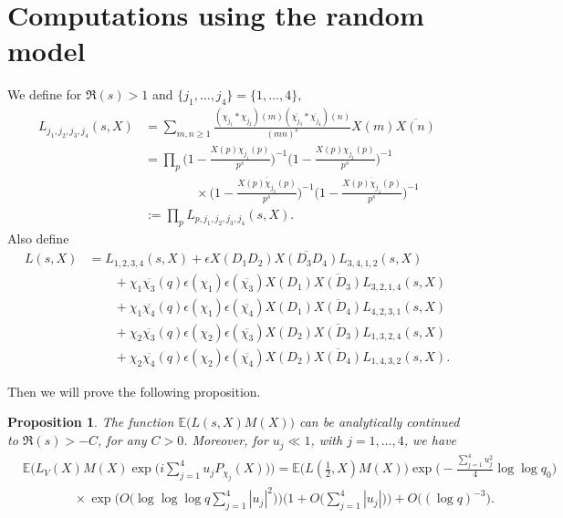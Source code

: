 \documentclass[12pt, reqno]{amsart}
\newcommand{\E}{\mathbb{E}}
\newtheorem{proposition}[theorem]{Proposition}
\numberwithin{equation}{section}
\numberwithin{theorem}{section}
\numberwithin{equation}{section}
\begin{document}
\section{Computations using the random model}\label{sectionrandom}
We define for $\Re(s)>1$ and $\{j_1,\ldots, j_4\}=\{1,\ldots,4\}$,
\begin{align*}
    L_{j_1,j_2,j_3,j_4}(s,X) &= \sum_{m,n \geq 1}\frac{(\chi_{j_1}*\chi_{j_2})(m)(\overline{\chi_{j_3}}*\overline{\chi_{j_4}})(n)}{(mn)^{s}}X(m) \overline{X(n)} \\
    & = \prod_p \Big( 1- \frac{X(p) \chi_{j_1}(p)}{p^s}\Big)^{-1} \Big( 1- \frac{X(p) \chi_{j_2}(p)}{p^s}\Big)^{-1} \\
    &\qquad\qquad\times\Big( 1- \frac{\overline{X(p) \chi_{j_3}(p)}}{p^s}\Big)^{-1}\Big( 1- \frac{\overline{X(p) \chi_{j_4}(p)}}{p^s}\Big)^{-1}\\
    &:= \prod_p L_{p,j_1,j_2,j_3,j_4}(s,X).
\end{align*}
Also define
\begin{align}
    L(s,X) &=  L_{1,2,3,4}(s,X)+\epsilon X(D_1D_2) \overline{X(D_3D_4)} L_{3,4,1,2}(s,X) \label{lx} \\
&\qquad+ \chi_1\overline{\chi_3}(q)\epsilon(\chi_1)\epsilon(\overline{\chi_3}) X(D_1) \overline{X(D_3)} L_{3,2,1,4}(s,X) \nonumber \\
&\qquad+\chi_1\overline{\chi_4}(q)\epsilon(\chi_1)\epsilon(\overline{\chi_4}) X(D_1) \overline{X(D_4)}L_{4,2,3,1}(s,X) \nonumber \\
&\qquad+\chi_2\overline{\chi_3}(q)\epsilon(\chi_2)\epsilon(\overline{\chi_3})X(D_2) \overline{X(D_3)} L_{1,3,2,4}(s,X) \nonumber \\
&\qquad+\chi_2\overline{\chi_4}(q)\epsilon(\chi_2)\epsilon(\overline{\chi_4})X(D_2) \overline{X(D_4)}L_{1,4,3,2}(s,X).\nonumber
\end{align}

Then we will prove the following proposition.

\begin{proposition}
\label{main_prop}
    The function $\E\big(L(s,X) M(X)\big)$ can be analytically continued to $\Re(s)>-C$, for any $C>0$. Moreover, for $u_j\ll1$, with $j=1,\ldots,4$, we have
    \begin{align*}
        &\E\Bigg( L_V(X) M(X) \exp\bigg(  i\sum_{j=1}^4 u_jP_{\chi_j}(X)\bigg)\Bigg)= \E \Big(L(\tfrac12,X)M(X)\Big) \exp \Big(  - \frac{\sum_{j=1}^4 u_j^2}{4} \log \log q_0 \Big)  \\
    &\qquad\qquad \times \exp \bigg( O \Big(  \log \log \log q \sum_{j=1}^4 |u_j|^2\Big) \bigg) \bigg(1 +O \Big(  \sum_{j=1}^4 |u_j|\Big) \bigg) +O\big(  (\log q)^{-3}\big).
    \end{align*}
\end{proposition}
\end{document}
